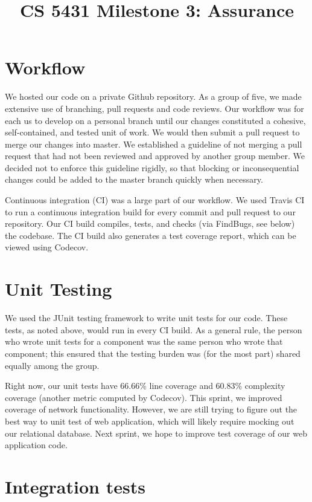 \documentclass[a4paper,12pt]{article}
\title{CS 5431 Milestone 3: Assurance}
\author{
\iam{James Cassell}{jcc384}
\and
\iam{Evan King}{esk79}
\and
\iam{Ethan Koenig}{etk39}
\and
\iam{Eric Perdew}{ecp84}
\and
\iam{Will Ronchetti}{wrr33}
}
\begin{document}
\maketitle

\section{Workflow}
We hosted our code on a private Github repository. As a group of five, we made extensive use of branching, pull requests and code reviews. Our workflow was for each us to develop on a personal branch until our changes constituted a cohesive, self-contained, and tested unit of work. We would then submit a pull request to merge our changes into master. We established a guideline of not merging a pull request that had not been reviewed and approved by another group member. We decided not to enforce this guideline rigidly, so that blocking or inconsequential changes could be added to the master branch quickly when necessary.

Continuous integration (CI) was a large part of our workflow. We used Travis CI to run a continuous integration build for every commit and pull request to our repository. Our CI build compiles, tests, and checks (via FindBugs, see below) the codebase. The CI build also generates a test coverage report, which can be viewed using Codecov.

\section{Unit Testing}

We used the JUnit testing framework to write unit tests for our code. These tests, as noted above, would run in every CI build. As a general rule, the person who wrote unit tests for a component was the same person who wrote that component; this ensured that the testing burden was (for the most part) shared equally among the group.

Right now, our unit tests have 66.66\% line coverage and 60.83\% complexity coverage (another metric computed by Codecov). This sprint, we improved coverage of network functionality. However, we are still trying to figure out the best way to unit test of web application, which will likely require mocking out our relational database. Next sprint, we hope to improve test coverage of our web application code.

\section{Integration tests}
\end{document}
